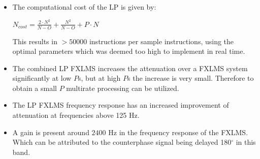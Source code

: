 \large
\begin{itemize}
\item The computational cost of the LP is given by:
\vspace{-2mm}
\begin{center}
{\large
$N_{cost}=\frac{2 \cdot N^2}{N-O}+\frac{N^2}{N-O}+P \cdot N$
}
\end{center}

	  This results in $>50000$ instructions per sample instructions, using the optimal parameters which was deemed too high to implement in real time. \\
\item The combined LP FXLMS increases the attenuation over a FXLMS system significantly at low $P$s, but at high $P$s the increase is very small. 
	  Therefore to obtain a small $P$ multirate processing can be utilized. \\ 
\item The LP FXLMS frequency response has an increased improvement of attenuation at frequencies above 125 Hz. \\
\item A gain is present around $2400$ Hz in the frequency response of the FXLMS. Which can be attributed to the counterphase signal being delayed 180$^{\circ}$ in this band.

\end{itemize}

